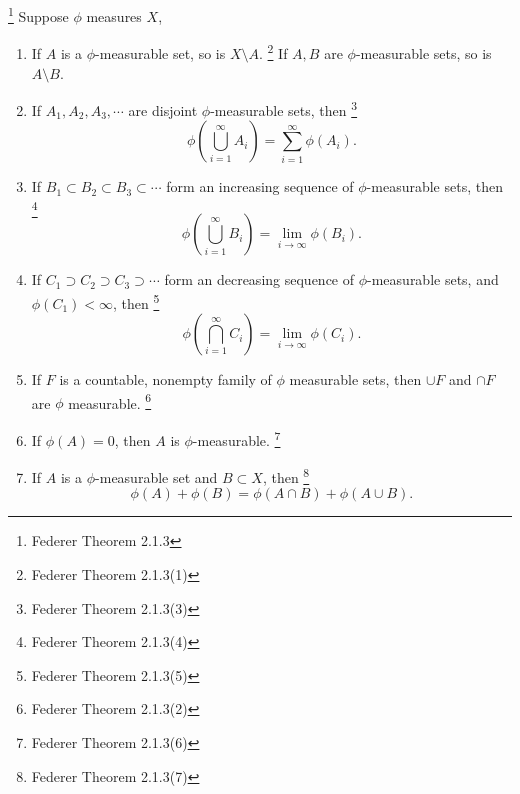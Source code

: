 \begin{theorem} \label{T:meas_prop}
\footnote{Federer Theorem 2.1.3}
Suppose $\phi$ measures $X$,
\begin{enumerate}
  \item If $A$ is a $\phi$-measurable set, so is $X\setminus A$.
    \footnote{Federer Theorem 2.1.3(1)}
    If $A,B$ are $\phi$-measurable sets, so is $A\setminus B$.
  \item If $A_1,A_2,A_3,\cdots$ are disjoint $\phi$-measurable sets, then
    \footnote{Federer Theorem 2.1.3(3)}
    \[
      \phi\left( \bigcup_{i=1}^{\infty} A_i \right) 
        = \sum_{i=1}^{\infty} \phi(A_i).
    \]
  \item If $B_1\subset B_2\subset B_3\subset \cdots$ form an increasing sequence
    of $\phi$-measurable sets, then
    \footnote{Federer Theorem 2.1.3(4)}
    \[
      \phi\left( \bigcup_{i=1}^{\infty} B_i \right) 
        = \lim_{i\to \infty}\phi(B_i).
    \]
  \item If $C_1\supset C_2\supset C_3\supset \cdots$ form an decreasing 
    sequence of $\phi$-measurable sets, and $\phi(C_1)<\infty$, then
    \footnote{Federer Theorem 2.1.3(5)}
    \[
      \phi\left( \bigcap_{i=1}^{\infty} C_i \right) 
        = \lim_{i\to \infty}\phi(C_i).
    \]
  \item If $F$ is a countable, nonempty family of $\phi$ measurable sets, then
    $\cup F$ and $\cap F$ are $\phi$ measurable.
    \footnote{Federer Theorem 2.1.3(2)}
  \item If $\phi(A)=0$, then $A$ is $\phi$-measurable.
    \footnote{Federer Theorem 2.1.3(6)}
  \item If $A$ is a $\phi$-measurable set and $B\subset X$, then
    \footnote{Federer Theorem 2.1.3(7)}
    \[
      \phi(A)+\phi(B)=\phi(A\cap B)+\phi(A\cup B).
    \]
\end{enumerate}
\end{theorem}

